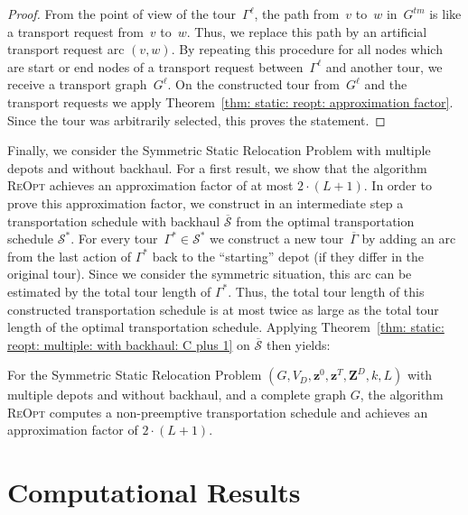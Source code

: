 \documentclass[english]{llncs}
\numberwithin{sublemma}{lemma}
\newcommand{\capd}{\ensuremath{L}}
\newcommand{\tourd}{\ensuremath{\Gamma}}
\newcommand{\sched}{\mathcal{S}}
\newcommand{\schedule}{\sched}
\newcommand{\z}{\boldsymbol{z}}
\newcommand{\zd}{\boldsymbol{Z}^D} \newcommand{\zzd}{Z^D}
\newcommand{\REOPT}{\textsc{ReOpt}\xspace}
\newcommand{\VD}{V_D}
\begin{document}
\begin{proof}
From the point of view of the tour~$\tourd^\ell$, the path from~$v$ to~$w$ in~$G^{tm}$ is like a transport request from~$v$ to~$w$.
Thus, we replace this path by an artificial transport request arc $(v, w)$.
By repeating this procedure for all nodes which are start or end nodes of a transport request between~$\tourd^\ell$ and another tour, we receive a transport graph~$G^\ell$.
On the constructed tour from~$G^\ell$ and the transport requests we apply Theorem~\ref{thm: static: reopt: approximation factor}.
Since the tour was arbitrarily selected, this proves the statement.
\end{proof}




Finally, we consider the Symmetric Static Relocation Problem with multiple depots and without backhaul.
For a first result, we show that the algorithm \REOPT achieves an approximation factor of at most $2 \cdot (\capd + 1)$.
In order to prove this approximation factor, we construct in an intermediate step a transportation schedule with backhaul $\overline{\schedule}$ from the optimal transportation schedule $\schedule^*$.
For every tour~$\tourd^* \in \schedule^*$ we construct a new tour~$\overline{\tourd}$ by adding an arc from the last action of $\tourd^*$ back to the ``starting'' depot (if they differ in the original tour).
Since we consider the symmetric situation, this arc can be estimated by the total tour length of $\tourd^*$.
Thus, the total tour length of this constructed transportation schedule is at most twice as large as the total tour length of the optimal transportation schedule.
Applying Theorem~\ref{thm: static: reopt: multiple: with backhaul: C plus 1} on $\overline{\schedule}$ then yields:


\begin{theorem}\label{thm: static: reopt: multiple: symmetric: without backhaul: 2 C plus 1}
For the Symmetric Static Relocation Problem $(G, \VD, \z^0, \z^T, \zd, k, \capd)$ with multiple depots and without backhaul, and a complete graph $G$,
the algorithm \REOPT computes a non-preemptive transportation schedule and achieves an approximation factor of $2 \cdot (\capd + 1)$.
\end{theorem}







\section{Computational Results}
\label{seq: computational}
\end{document}
